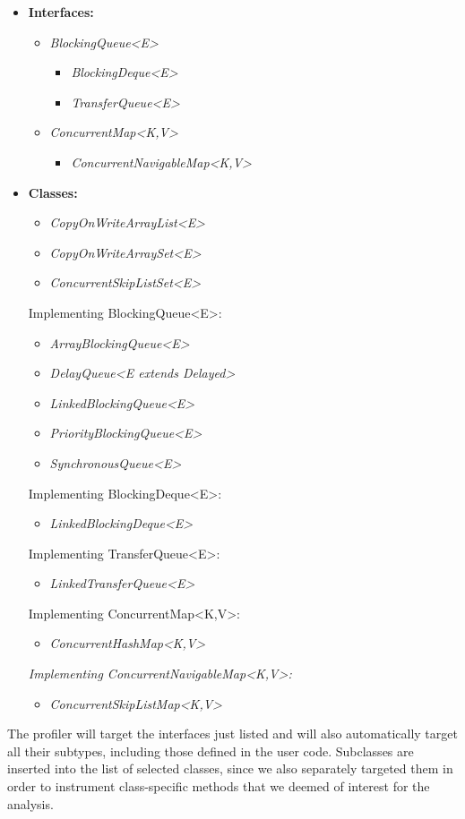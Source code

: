 \documentclass[]{usiinfthesis}
\begin{document}
\begin{itemize}
    \item \textbf{Interfaces:}
    \begin{itemize}
        \item \textit{BlockingQueue<E>}
        \begin{itemize}
            \item \textit{BlockingDeque<E>}
            \item \textit{TransferQueue<E>}
        \end{itemize}
        \item \textit{ConcurrentMap<K,V>}
        \begin{itemize}
            \item \textit{ConcurrentNavigableMap<K,V>}
        \end{itemize}
    \end{itemize}
    \item \textbf{Classes:}
    \begin{itemize}
        \item \textit{CopyOnWriteArrayList<E>}
        \item \textit{CopyOnWriteArraySet<E>}
        \item \textit{ConcurrentSkipListSet<E>}
    \end{itemize}
    Implementing BlockingQueue<E>:
    \begin{itemize}
        \item \textit{ArrayBlockingQueue<E>}
        \item \textit{DelayQueue<E extends Delayed>}
        \item \textit{LinkedBlockingQueue<E>}
        \item \textit{PriorityBlockingQueue<E>}
        \item \textit{SynchronousQueue<E>}
    \end{itemize}
    Implementing BlockingDeque<E>:
    \begin{itemize}
        \item \textit{LinkedBlockingDeque<E>}
    \end{itemize}
    Implementing TransferQueue<E>:
    \begin{itemize}
        \item \textit{LinkedTransferQueue<E>}
    \end{itemize}
    Implementing ConcurrentMap<K,V>:
    \begin{itemize}
        \item \textit{ConcurrentHashMap<K,V>}
    \end{itemize}
    \textit{Implementing ConcurrentNavigableMap<K,V>:}
    \begin{itemize}
        \item \textit{ConcurrentSkipListMap<K,V>}
    \end{itemize}
\end{itemize}
The profiler will target the interfaces just listed and will also automatically target all their subtypes, including those defined in the user code. Subclasses are inserted into the list of selected classes, since we also separately targeted them in order to instrument class-specific methods that we deemed of interest for the analysis.
\end{document}
